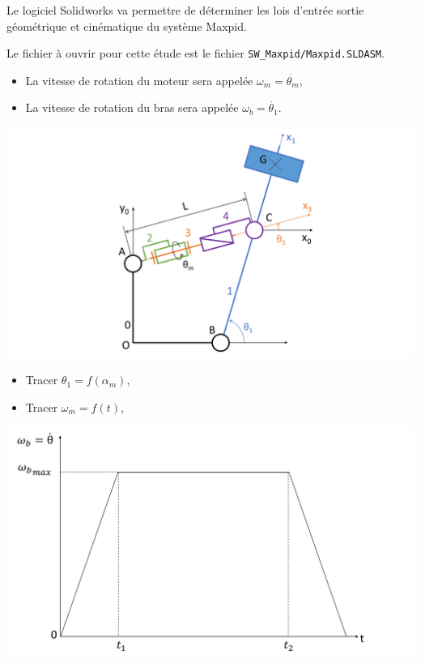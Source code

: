 
\newpage


Le logiciel Solidworks va permettre de déterminer les lois d'entrée sortie géométrique et cinématique du système Maxpid.

Le fichier à ouvrir pour cette étude est le fichier \verb?SW_Maxpid/Maxpid.SLDASM?.

\begin{itemize}
 \item La vitesse de rotation du moteur sera appelée $\omega_m=\dot{\theta_m}$,
 \item La vitesse de rotation du bras sera appelée $\omega_b=\dot{\theta_1}$.
\end{itemize}

\begin{center}
 \includegraphics[width=0.8\linewidth]{img/Maxpid_cin}
\end{center}

 
\begin{itemize}
 \item Tracer $\theta_1=f(\alpha_m)$,
 \item Tracer $\omega_m=f(t)$,
\end{itemize}


\begin{center}
 \includegraphics[width=0.8\linewidth]{img/Maxpid_profil}
\end{center}

